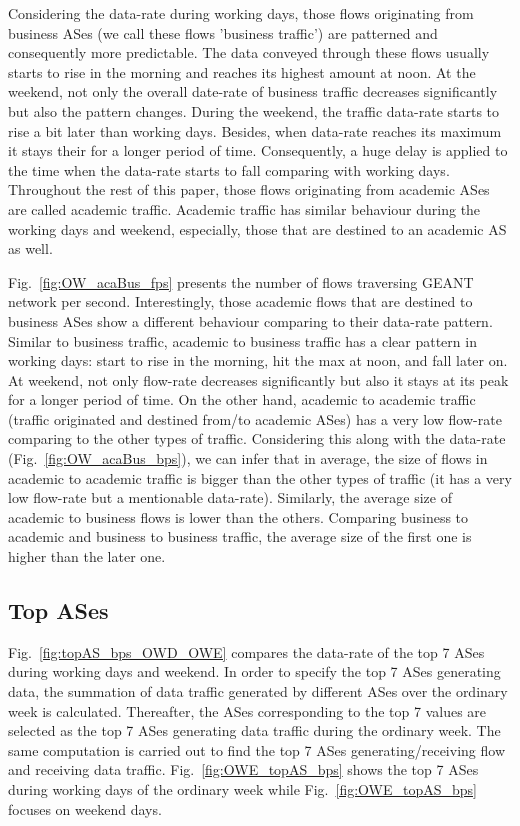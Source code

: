 \documentclass[10pt, journal, letterpaper]{IEEEtran}
\begin{document}
Considering the data-rate during working days, those flows originating from business ASes (we call these flows 'business traffic') are patterned and consequently more predictable. The data conveyed through these flows usually starts to rise in the morning and reaches its highest amount at noon. At the weekend, not only the overall date-rate of business traffic decreases significantly but also the pattern changes. During the weekend, the traffic data-rate starts to rise a bit later than working days. Besides, when data-rate reaches its maximum it stays their for a longer period of time. Consequently, a huge delay is applied to the time when the data-rate starts to fall comparing with working days.
Throughout the rest of this paper, those flows originating from academic ASes are called academic traffic. Academic traffic has similar behaviour during the working days and weekend, especially, those that are destined to an academic AS as well. 

Fig.~\ref{fig:OW_acaBus_fps} presents the number of flows traversing GEANT network per second. Interestingly, those academic flows that are destined to business ASes show a different behaviour comparing to their data-rate pattern. Similar to business traffic, academic to business traffic has a clear pattern in working days: start to rise in the morning, hit the max at noon, and fall later on. At weekend, not only flow-rate decreases significantly but also it stays at its peak for a longer period of time. On the other hand, academic to academic traffic (traffic originated and destined from/to academic ASes) has a very low flow-rate comparing to the other types of traffic. Considering this along with the data-rate (Fig.~\ref{fig:OW_acaBus_bps}), we can infer that in average, the size of flows in academic to academic traffic is bigger than the other types of traffic (it has a very low flow-rate but a mentionable data-rate). Similarly, the average size of academic to business flows is lower than the others. Comparing business to academic and business to business traffic, the average size of the first one is higher than the later one.

\subsection{Top ASes}
Fig.~\ref{fig:topAS_bps_OWD_OWE} compares the data-rate of the top 7 ASes during working days and weekend. In order to specify the top 7 ASes generating data, the summation of data traffic generated by different ASes over the ordinary week is calculated. Thereafter, the ASes corresponding to the top 7 values are selected as the top 7 ASes generating data traffic during the ordinary week. The same computation is carried out to find the top 7 ASes generating/receiving flow and receiving data traffic. Fig.~\ref{fig:OWE_topAS_bps} shows the top 7 ASes during working days of the ordinary week while Fig.~\ref{fig:OWE_topAS_bps} focuses on weekend days. 
\end{document}
